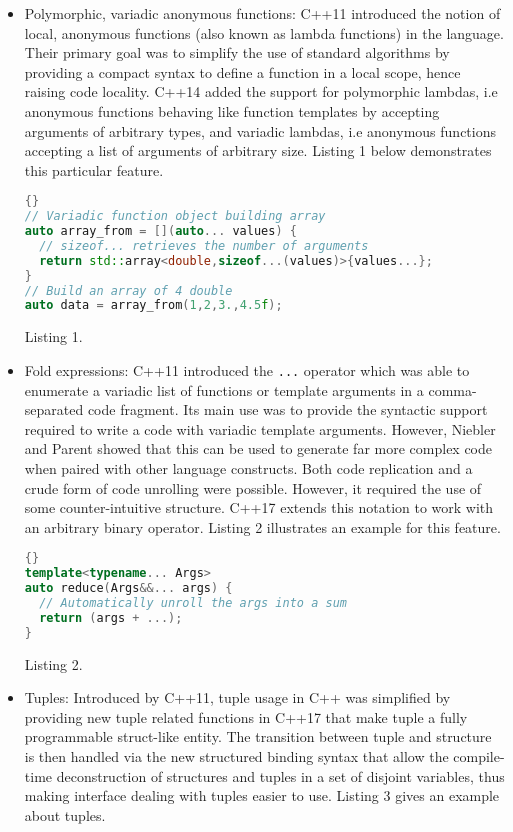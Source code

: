 \documentclass[../../main.tex]{subfiles}
\begin{document}
\begin{itemize}
\item Polymorphic, variadic anonymous functions: C++11
introduced the notion of local, anonymous functions
(also known as lambda functions) in the language.
Their primary goal was to simplify the use of standard
algorithms by providing a compact syntax to define a
function in a local scope, hence raising code locality.
C++14 added the support for polymorphic lambdas, i.e
anonymous functions behaving like function templates
by accepting arguments of arbitrary types, and variadic
lambdas, i.e anonymous functions accepting a list of
arguments of arbitrary size. Listing 1 below demonstrates
this particular feature.

\begin{lstlisting}[language=c++, caption=Sample polymorphic lambda definition]{}
// Variadic function object building array
auto array_from = [](auto... values) {
  // sizeof... retrieves the number of arguments
  return std::array<double,sizeof...(values)>{values...};
}
// Build an array of 4 double
auto data = array_from(1,2,3.,4.5f);
\end{lstlisting}
Listing 1.

\item Fold expressions: C++11 introduced the \lstinline{...} operator
which was able to enumerate a variadic list of functions
or template arguments in a comma-separated code
fragment. Its main use was to provide the syntactic
support required to write a code with variadic template
arguments. However, Niebler and Parent showed that
this can be used to generate far more complex code
when paired with other language constructs. Both
code replication and a crude form of code unrolling
were possible. However, it required the use of some
counter-intuitive structure. C++17 extends this notation
to work with an arbitrary binary operator. Listing 2
illustrates an example for this feature.

\begin{lstlisting}[language=c++, caption=C++17 fold expressions]{}
template<typename... Args>
auto reduce(Args&&... args) {
  // Automatically unroll the args into a sum
  return (args + ...);
}
\end{lstlisting}
Listing 2.

\item Tuples: Introduced by C++11, tuple usage in C++ was
simplified by providing new tuple related functions in
C++17 that make tuple a fully programmable struct-like
entity. The transition between tuple and structure is then
handled via the new structured binding syntax that allow
the compile-time deconstruction of structures and tuples
in a set of disjoint variables, thus making interface
dealing with tuples easier to use. Listing 3 gives an
example about tuples.


\end{itemize}
\end{document}
